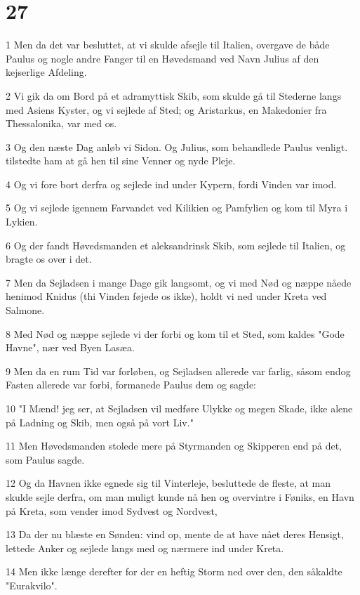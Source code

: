 \chapter{27}

\par 1 Men da det var besluttet, at vi skulde afsejle til Italien, overgave de både Paulus og nogle andre Fanger til en Høvedsmand ved Navn Julius af den kejserlige Afdeling.
\par 2 Vi gik da om Bord på et adramyttisk Skib, som skulde gå til Stederne langs med Asiens Kyster, og vi sejlede af Sted; og Aristarkus, en Makedonier fra Thessalonika, var med os.
\par 3 Og den næste Dag anløb vi Sidon. Og Julius, som behandlede Paulus venligt. tilstedte ham at gå hen til sine Venner og nyde Pleje.
\par 4 Og vi fore bort derfra og sejlede ind under Kypern, fordi Vinden var imod.
\par 5 Og vi sejlede igennem Farvandet ved Kilikien og Pamfylien og kom til Myra i Lykien.
\par 6 Og der fandt Høvedsmanden et aleksandrinsk Skib, som sejlede til Italien, og bragte os over i det.
\par 7 Men da Sejladsen i mange Dage gik langsomt, og vi med Nød og næppe nåede henimod Knidus (thi Vinden føjede os ikke), holdt vi ned under Kreta ved Salmone.
\par 8 Med Nød og næppe sejlede vi der forbi og kom til et Sted, som kaldes "Gode Havne", nær ved Byen Lasæa.
\par 9 Men da en rum Tid var forløben, og Sejladsen allerede var farlig, såsom endog Fasten allerede var forbi, formanede Paulus dem og sagde:
\par 10 "I Mænd! jeg ser, at Sejladsen vil medføre Ulykke og megen Skade, ikke alene på Ladning og Skib, men også på vort Liv."
\par 11 Men Høvedsmanden stolede mere på Styrmanden og Skipperen end på det, som Paulus sagde.
\par 12 Og da Havnen ikke egnede sig til Vinterleje, besluttede de fleste, at man skulde sejle derfra, om man muligt kunde nå hen og overvintre i Føniks, en Havn på Kreta, som vender imod Sydvest og Nordvest,
\par 13 Da der nu blæste en Sønden: vind op, mente de at have nået deres Hensigt, lettede Anker og sejlede langs med og nærmere ind under Kreta.
\par 14 Men ikke længe derefter for der en heftig Storm ned over den, den såkaldte "Eurakvilo".
